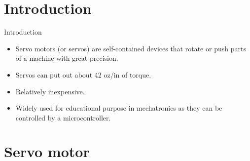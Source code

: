 \documentclass[table,10pt,red]{beamer}	%
\begin{document}
\section{Introduction}
\begin{frame}{Introduction}
	\begin{itemize}
		\item
		Servo motors (or servos) are self-contained devices that rotate or push parts of a machine with great precision.\\
		\item
		Servos can put out about 42 oz/in of torque.
		\item
		Relatively inexpensive.
		\item
		Widely used for educational purpose in mechatronics as they can be controlled by a microcontroller.
		
		
	\end{itemize}
\end{frame}

\section{Servo motor}
\end{document}
